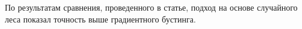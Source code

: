 \documentclass[fleqn,usenatbib]{mnras}
\begin{document}
По результатам сравнения, проведенного в статье, подход на основе случайного леса показал точность выше градиентного бустинга.



\end{document}
